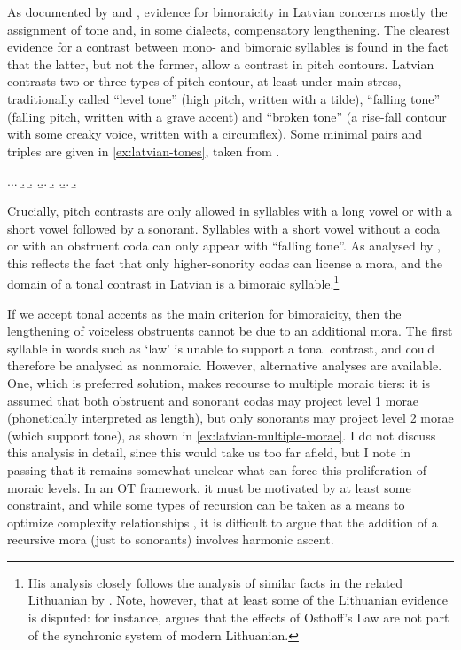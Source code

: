 As documented by \citet{karins96:_latvian} and \citet{daugavet10:_syllab_latvian_lithuan}, evidence for bimoraicity in Latvian concerns mostly the assignment of tone and, in some dialects, compensatory lengthening. The clearest evidence for a contrast between mono- and bimoraic syllables is found in the fact that the latter, but not the former, allow a contrast in pitch contours. Latvian contrasts two or three types of pitch contour, at least under main stress, traditionally called \enquote{level tone} (high pitch, written with a tilde), \enquote{falling tone} (falling pitch, written with a grave accent) and \enquote{broken tone} (a rise-fall contour with some creaky voice, written with a circumflex). Some minimal pairs and triples are given in \cref{ex:latvian-tones}, taken from \citet{daugavet10:_syllab_latvian_lithuan}.

\ex.\label{ex:latvian-tones}\a.\a.
\b.
\b.
\z.\b.\a.
\b.
\z.\b.\a.
\b.

Crucially, pitch contrasts are only allowed in syllables with a long vowel or with a short vowel followed by a sonorant. Syllables with a short vowel without a coda or with an obstruent coda can only appear with \enquote{falling tone}. As analysed by \citet{karins96:_latvian}, this reflects the fact that only higher\hyp sonority codas can license a mora, and the domain of a tonal contrast in Latvian is a bimoraic syllable.\footnote{His analysis closely follows the analysis of similar facts in the related Lithuanian by \citet{zec88:_sonor} \citep[see also][]{gordon06:_syllab}. Note, however, that at least some of the Lithuanian evidence is disputed: for instance, \citet[fn.~15]{daugavet10:_syllab_latvian_lithuan} argues that the effects of Osthoff's Law are not part of the synchronic system of modern Lithuanian.}

If we accept tonal accents as the main criterion for bimoraicity, then the lengthening of voiceless obstruents cannot be due to an additional mora. The first syllable in words such as \ipa{[ˈlikːums]} `law' is unable to support a tonal contrast, and could therefore be analysed as nonmoraic. However, alternative analyses are available. One, which is  preferred solution, makes recourse to  multiple moraic tiers: it is assumed that both obstruent and sonorant codas may project level 1 morae (phonetically interpreted as length), but only sonorants may project level 2 morae (which support tone), as shown in \cref{ex:latvian-multiple-morae}. I do not discuss this analysis in detail, since this would take us too far afield, but I note in passing that it remains somewhat unclear what can force this proliferation of moraic levels. In an OT framework, it must be motivated by at least some constraint, and while some types of recursion can be taken as a means to optimize complexity relationships \citep[\egm][]{dresher-vdhulst,rice07}, it is difficult to argue that the addition of a recursive mora (just to sonorants) involves harmonic ascent.

